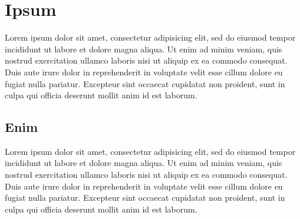 \documentclass[unrestrictedsummary]{sintefreport}
\begin{document}
\section{Ipsum}
\label{app2}
Lorem ipsum dolor sit amet, consectetur adipisicing elit, sed do eiusmod tempor
incididunt ut labore et dolore magna aliqua. Ut enim ad minim veniam, quis
nostrud exercitation ullamco laboris nisi ut aliquip ex ea commodo consequat.
Duis aute irure dolor in reprehenderit in voluptate velit esse cillum dolore eu
fugiat nulla pariatur. Excepteur sint occaecat cupidatat non proident, sunt in
culpa qui officia deserunt mollit anim id est laborum.

\subsection{Enim}
Lorem ipsum dolor sit amet, consectetur adipisicing elit, sed do eiusmod tempor
incididunt ut labore et dolore magna aliqua. Ut enim ad minim veniam, quis
nostrud exercitation ullamco laboris nisi ut aliquip ex ea commodo consequat.
Duis aute irure dolor in reprehenderit in voluptate velit esse cillum dolore eu
fugiat nulla pariatur. Excepteur sint occaecat cupidatat non proident, sunt in
culpa qui officia deserunt mollit anim id est laborum.

\backmatter
\end{document}
